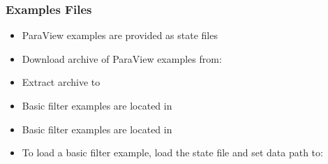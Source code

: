 \begin{frame}
  \frametitle{Examples Files}

    \begin{itemize}
      \item ParaView examples are provided as state files 
      \item Download archive of ParaView examples from:
      \item Extract archive to 
      \item Basic filter examples are located in 
      \item Basic filter examples are located in 
      \item To load a basic filter example, load the state file and set data path to:
    \end{itemize}
        

\end{frame}

